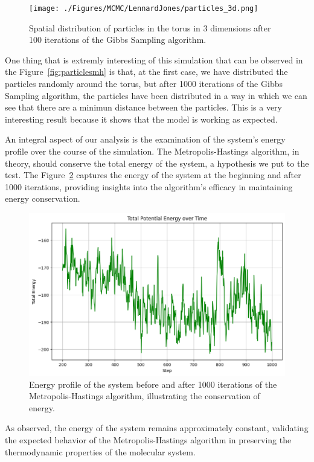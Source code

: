 \documentclass{report}
\begin{document}
\begin{figure}[H]
	\centering
	\texttt{[image: ./Figures/MCMC/LennardJones/particles\_3d.png]}
	\caption{Spatial distribution of particles in the torus in 3 dimensions after 100 iterations of the Gibbs Sampling algorithm.}
	\label{fig:particlesmh2}
\end{figure}

One thing that is extremly interesting of this simulation that can be observed in the Figure~\ref{fig:particlesmh} is that, at the first case, we have distributed the particles randomly around the torus, but after 1000 iterations of the Gibbs Sampling algorithm, the particles have been distributed in a way in which we can see that there are a minimun distance between the particles. This is a very interesting result because it shows that the model is working as expected.

An integral aspect of our analysis is the examination of the system's energy profile over the course of the simulation. The Metropolis-Hastings algorithm, in theory, should conserve the total energy of the system, a hypothesis we put to the test. The Figure~\ref{fig:energymh} captures the energy of the system at the beginning and after 1000 iterations, providing insights into the algorithm's efficacy in maintaining energy conservation.

\begin{figure}[H]
	\centering
	\includegraphics[width=0.75\linewidth]{./Figures/MCMC/LennardJones/energy.png}
	\caption{Energy profile of the system before and after 1000 iterations of the Metropolis-Hastings algorithm, illustrating the conservation of energy.}
	\label{fig:energymh}
\end{figure}

As observed, the energy of the system remains approximately constant, validating the expected behavior of the Metropolis-Hastings algorithm in preserving the thermodynamic properties of the molecular system.
\end{document}
